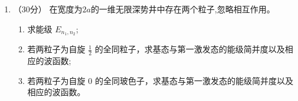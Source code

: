 \begin{enumerate}
{\begin{enumerate}
		\item 低能态 $|\psi_-\rangle$ 的上分量模方为 $1/2$，故
		\[
			\boxed{P(S_z=+\hbar/2)=\frac12}.
		\]

		\item 若磁场的 Zeeman 项为 $-\gamma B S_z$，且原哈密顿量在
		$t>0$ 后仍然存在，则
		\[
			H_{\rm tot}=S_x+S_y-\gamma B S_z.
		\]
		记 $\vec d=(1,1,-\gamma B)$、$D=|\vec d|$，则
		$H_{\rm tot}=(\hbar/2)\vec d\cdot\vec\sigma$，且
		\[
		 U=I\cos\frac{Dt}{2}-i\frac{\vec d\cdot\vec\sigma}{D}\sin\frac{Dt}{2}.
		\]
		初态的 Bloch 矢量为 $\langle\vec\sigma\rangle_-=-(1,1,0)/\sqrt2$，故
		\[
		 \langle\psi_-|U|\psi_-\rangle=\cos\frac{Dt}{2}
		       +i\frac{\sqrt2}{D}\sin\frac{Dt}{2}.
		\]
		取模平方得到
		\[
			\boxed{P_-(t)=1-\frac{(\gamma B)^2}{2+(\gamma B)^2}
			\sin^2\left(\frac{Dt}{2}\right)}.
		\]
		这里系数 $1$ 与 $\gamma B$ 必须采用同一频率单位。若题意是
		$t>0$ 时关闭原来的 $S_x+S_y$、只保留 Zeeman 项，则相应结果为
		\[
			\boxed{P_-(t)=\cos^2\left(\frac{\gamma Bt}{2}\right)}.
		\]
		题干没有说明原哈密顿量是否撤去，以上分别列出两种物理情形。
	\end{enumerate}
}



\newpage
\item 
（30分）
在宽度为$ 2a $的一维无限深势井中存在两个粒子,忽略相互作用。
\begin{enumerate}
	\item
	求能级 $E_{n_{1}, n_{2}}$;
	\item
	若两粒子为自旋 $\frac{1}{2}$ 的全同粒子，求基态与第一激发态的能级简并度以及相应的波函数;
	\item
	若两粒子为自旋 $0$ 的全同玻色子，求基态与第一激发态的能级简并度以及相应的波函数。
	
	
	
\end{enumerate}
\end{enumerate}
